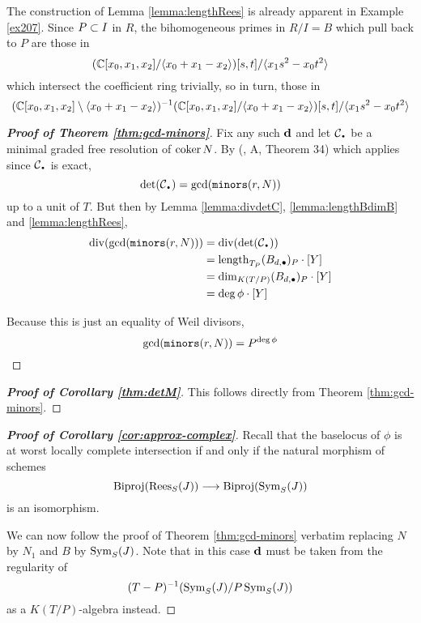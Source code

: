 \documentclass[fleqn,reqno]{amsart}
\numberwithin{first}{chapter}
\begin{document}
\begin{example}
The construction of Lemma \ref{lemma:lengthRees} is already apparent in Example \ref{ex207}.
Since $P\subset I$ in $R$, the bihomogeneous primes in $R/I=B$
which pull back to $P$ are those in
\[
(\mathbb{C}[x_0,x_1,x_2]/\langle x_0+x_1-x_2\rangle)[s,t]/\langle x_1s^2-x_0t^2\rangle
\]
which intersect the coefficient ring trivially, so in turn, those in
\[
(\mathbb{C}[x_0,x_1,x_2]\setminus\langle x_0+x_1-x_2\rangle)^{-1}(\mathbb{C}[x_0,x_1,x_2]/\langle x_0+x_1-x_2\rangle)[s,t]/\langle x_1s^2-x_0t^2\rangle
\]
\end{example}

\begin{proof}[\bf Proof of Theorem \ref{thm:gcd-minors}]
Fix any such $\mathbf d$ and let $\mathcal{C}_\nbul$ be a minimal graded free resolution of $\operatorname{coker} N$.
By (\citet{GKZ-book-94}, A, Theorem 34) which applies since $\mathcal{C}_\nbul$ is exact,
\[
\det(\mathcal{C}_\nbul)=\gcd(\mt{minors}(r,N))
\]
up to a unit of $T$. But then by Lemma \ref{lemma:divdetC}, \ref{lemma:lengthBdimB} and \ref{lemma:lengthRees},
\begin{align*}
\thediv(\gcd(\mt{minors}(r,N)))&=\thediv(\det(\mathcal{C}_\nbul))\\
&=\length_{T_P} (B_{d,\bullet})_P\cdot[Y]\\
&=\dim_{K(T/P)} (B_{d,\bullet})_P\cdot[Y]\\
&=\deg\phi\cdot[Y]
\end{align*}

Because this is just an equality of Weil divisors,
\[
\gcd(\mathop{\tt minors}(r,N))=P^{\deg\phi}\qedhere
\]
\end{proof}

\begin{proof}[\bf Proof of Corollary \ref{thm:detM}]
This follows directly from Theorem \ref{thm:gcd-minors}.
\end{proof}

\begin{proof}[\bf Proof of Corollary \ref{cor:approx-complex}]
Recall that the baselocus of $\phi$ is at worst locally complete intersection if and only if
the natural morphism of schemes
\[
\operatorname{Biproj}(\operatorname{Rees}_S(J))\longrightarrow\operatorname{Biproj}(\operatorname{Sym}_S(J))
\]
is an isomorphism.

We can now follow the proof of Theorem \ref{thm:gcd-minors} verbatim replacing
$N$ by $N_1$ and $B$ by $\operatorname{Sym}_S(J)$. Note that in this case $\mathbf d$ must be taken
from the regularity of
\[
(T-P)^{-1}(\operatorname{Sym}_S(J)/P\operatorname{Sym}_S(J))
\]
as a $K(T/P)$-algebra instead.
\end{proof}
\end{document}

